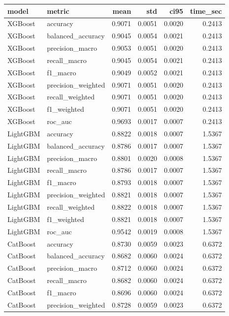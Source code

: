 \begin{tabular}{llrrrr}
\toprule
model & metric & mean & std & ci95 & time_sec \\
\midrule
XGBoost & accuracy & 0.9071 & 0.0051 & 0.0020 & 0.2413 \\
XGBoost & balanced_accuracy & 0.9045 & 0.0054 & 0.0021 & 0.2413 \\
XGBoost & precision_macro & 0.9053 & 0.0051 & 0.0020 & 0.2413 \\
XGBoost & recall_macro & 0.9045 & 0.0054 & 0.0021 & 0.2413 \\
XGBoost & f1_macro & 0.9049 & 0.0052 & 0.0021 & 0.2413 \\
XGBoost & precision_weighted & 0.9071 & 0.0051 & 0.0020 & 0.2413 \\
XGBoost & recall_weighted & 0.9071 & 0.0051 & 0.0020 & 0.2413 \\
XGBoost & f1_weighted & 0.9071 & 0.0051 & 0.0020 & 0.2413 \\
XGBoost & roc_auc & 0.9693 & 0.0017 & 0.0007 & 0.2413 \\
LightGBM & accuracy & 0.8822 & 0.0018 & 0.0007 & 1.5367 \\
LightGBM & balanced_accuracy & 0.8786 & 0.0017 & 0.0007 & 1.5367 \\
LightGBM & precision_macro & 0.8801 & 0.0020 & 0.0008 & 1.5367 \\
LightGBM & recall_macro & 0.8786 & 0.0017 & 0.0007 & 1.5367 \\
LightGBM & f1_macro & 0.8793 & 0.0018 & 0.0007 & 1.5367 \\
LightGBM & precision_weighted & 0.8821 & 0.0018 & 0.0007 & 1.5367 \\
LightGBM & recall_weighted & 0.8822 & 0.0018 & 0.0007 & 1.5367 \\
LightGBM & f1_weighted & 0.8821 & 0.0018 & 0.0007 & 1.5367 \\
LightGBM & roc_auc & 0.9542 & 0.0019 & 0.0008 & 1.5367 \\
CatBoost & accuracy & 0.8730 & 0.0059 & 0.0023 & 0.6372 \\
CatBoost & balanced_accuracy & 0.8682 & 0.0060 & 0.0024 & 0.6372 \\
CatBoost & precision_macro & 0.8712 & 0.0060 & 0.0024 & 0.6372 \\
CatBoost & recall_macro & 0.8682 & 0.0060 & 0.0024 & 0.6372 \\
CatBoost & f1_macro & 0.8696 & 0.0060 & 0.0024 & 0.6372 \\
CatBoost & precision_weighted & 0.8728 & 0.0059 & 0.0023 & 0.6372 \\

\end{tabular}
